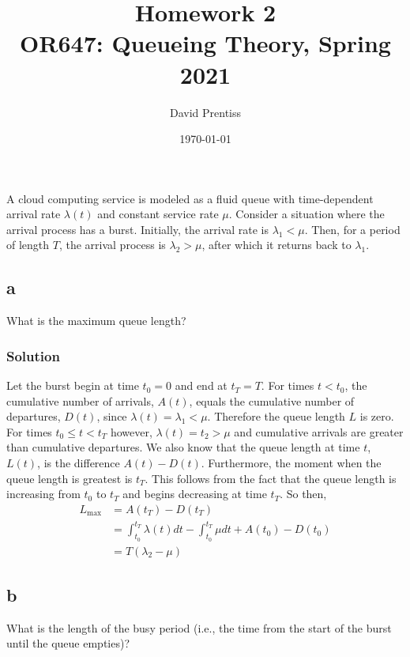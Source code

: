 \documentclass[letterpaper]{amsart}
\title[Homework 2]{Homework 2 \\ OR647: Queueing Theory, Spring 2021}
\author{David Prentiss}
\date{\today}
\begin{document}
\maketitle

\section{} %
A cloud computing service is modeled as a fluid queue with time-dependent
arrival rate $\lambda(t)$ and constant service rate $\mu$. Consider a situation where the
arrival process has a burst. Initially, the arrival rate is $\lambda_1<\mu$. Then, for a
period of length $T$, the arrival process is $\lambda_2>\mu$, after which it
returns back to $\lambda_1$.

\subsection*{a}
What is the maximum queue length?
\subsubsection*{Solution}
Let the burst begin at time $t_0 = 0$ and end at $t_T = T$. For times $t<t_0$, the
cumulative number of arrivals, $A(t)$, equals the cumulative number of
departures, $D(t)$, since $\lambda(t) = \lambda_1 < \mu$. Therefore the queue
length $L$ is zero. For times $t_0\leq t<t_T$ however, $\lambda(t) = t_2 > \mu$
and cumulative arrivals are greater than cumulative departures. We also know
that the queue length at time $t$, $L(t)$, is the difference $A(t)-D(t)$.
Furthermore, the moment when the queue length is greatest is $t_T$. This follows
from the fact that the queue length is increasing from $t_0$ to $t_T$ and begins
decreasing at time $t_T$. So then,
\begin{align}
  L_\text{max} &= A(t_T) - D(t_T) \\
  &= \int_{t_0}^{t_T}\lambda(t)dt - \int_{t_0}^{t_T}\mu dt + A(t_0)-D(t_0) \\
  &= T(\lambda_2 - \mu)
\end{align}

\subsection*{b}
What is the length of the busy period (i.e., the time from the start of the burst until the
queue empties)?
\end{document}
